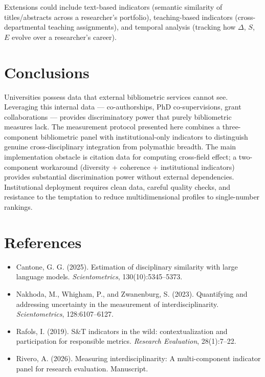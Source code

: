 \documentclass[
]{article}
\providecommand{\tightlist}{%
  \setlength{\itemsep}{0pt}\setlength{\parskip}{0pt}}
\begin{document}
Extensions could include text-based indicators (semantic similarity of
titles/abstracts across a researcher's portfolio), teaching-based
indicators (cross-departmental teaching assignments), and temporal
analysis (tracking how \(\Delta\), \(S\), \(E\) evolve over a
researcher's career).

\hypertarget{conclusions}{%
\section{Conclusions}\label{conclusions}}

Universities possess data that external bibliometric services cannot
see. Leveraging this internal data --- co-authorships, PhD
co-supervisions, grant collaborations --- provides discriminatory power
that purely bibliometric measures lack. The measurement protocol
presented here combines a three-component bibliometric panel with
institutional-only indicators to distinguish genuine cross-disciplinary
integration from polymathic breadth. The main implementation obstacle is
citation data for computing cross-field effect; a two-component
workaround (diversity + coherence + institutional indicators) provides
substantial discrimination power without external dependencies.
Institutional deployment requires clean data, careful quality checks,
and resistance to the temptation to reduce multidimensional profiles to
single-number rankings.

\hypertarget{references}{%
\section{References}\label{references}}

\begin{itemize}
\tightlist
\item
  Cantone, G. G. (2025). Estimation of disciplinary similarity with
  large language models. \emph{Scientometrics}, 130(10):5345--5373.
\item
  Nakhoda, M., Whigham, P., and Zwanenburg, S. (2023). Quantifying and
  addressing uncertainty in the measurement of interdisciplinarity.
  \emph{Scientometrics}, 128:6107--6127.
\item
  Rafols, I. (2019). S\&T indicators in the wild: contextualization and
  participation for responsible metrics. \emph{Research Evaluation},
  28(1):7--22.
\item
  Rivero, A. (2026). Measuring interdisciplinarity: A multi-component
  indicator panel for research evaluation. Manuscript.
\end{itemize}
\end{document}
